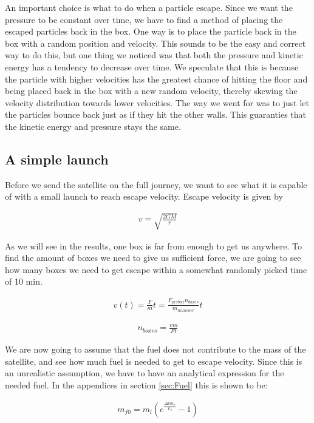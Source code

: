 \documentclass[a4paper, 10pt]{article}
\begin{document}
An important choice is what to do when a particle escape. Since we want the pressure to be constant over time, we have to find a method of placing the escaped particles back in the box. One way is to place the particle back in the box with a random position and velocity. This sounds to be the easy and correct way to do this, but one thing we noticed was that both the pressure and kinetic energy has a tendency to decrease over time. We speculate that this is because the particle with higher velocities has the greatest chance of hitting the floor and being placed back in the box with a new random velocity, thereby skewing the velocity distribution towards lower velocities. The way we went for was to just let the particles bounce back just as if they hit the other walls. This guaranties that the kinetic energy and pressure stays the same. 

\subsection{A simple launch}

Before we send the satellite on the full journey, we want to see what it is capable of with a small launch to reach escape velocity. Escape velocity is given by 

\begin{align}\label{eq:escape}
v = \sqrt{\frac{2GM}{r}}
\end{align}

As we will see in the results, one box is far from enough to get us anywhere. To find the amount of boxes we need to give us sufficient force, we are going to see how many boxes we need to get escape within a somewhat randomly picked time of 10 min.

\begin{align}
v(t) = \frac{F}{m} t = \frac{F_{per box}n_{boxes}}{m_{launcher}} t
\end{align}

\begin{align}\label{eq:boxes}
n_{boxes} = \frac{v m}{F t}
\end{align}

We are now going to assume that the fuel does not contribute to the mass of the satellite, and see how much fuel is needed to get to escape velocity. Since this is an unrealistic assumption, we have to have an analytical expression for the needed fuel. In the appendices in section \ref{sec:Fuel} this is shown to be:

\begin{align}\label{eq:Fuel}
m_{f0} = m_l(e^{\frac{\Delta v m_e}{F_b}} - 1)
\end{align}
\end{document}
